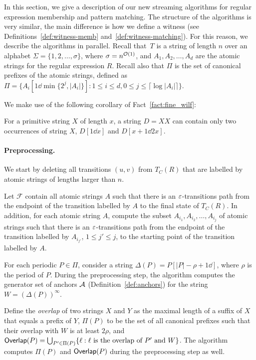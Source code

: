 In this section, we give a description of our new streaming algorithms for regular expression membership and pattern matching. The structure of the algorithms is very similar, the main difference is how we define a witness (see Definitions~\ref{def:witness-memb} and~\ref{def:witness-matching}). For this reason, we describe the algorithms in parallel. Recall that~$T$ is a string of length $n$ over an alphabet $\Sigma  = \{1, 2, \ldots, \sigma\}$, where $\sigma = n^{\mathcal{O}(1)}$, and $A_1, A_2, \ldots, A_d$ are the atomic strings for the regular expression $R$. Recall also that $\Pi$ is the set of canonical prefixes of the atomic strings, defined as $\Pi = \{A_i[1 \dd \min\{2^j, |A_i|\}] : 1\le  i \le d, 0 \le j \le \lceil \log |A_i|\rceil\}$. 

We make use of the following corollary of Fact~\ref{fact:fine_wilf}:

\begin{corollary}\label{cor:primitive}
For a primitive string $X$ of length $x$, a string $D = XX$ can contain only two occurrences of string $X$, $D[1\dd x]$ and $D[x+1\dd 2x]$.
\end{corollary}

\paragraph{Preprocessing.} 
We start by deleting all transitions $(u,v)$ from $T_C(R)$ that are labelled by atomic strings of lengths larger than $n$. 

Let $\mathcal{F}$ contain all atomic strings $A$ such that there is an $\varepsilon$-transitions path from the endpoint of the transition labelled by $A$ to the final state of $T_C(R)$. In addition, for each atomic string $A$, compute the subset $A_{i_1}, A_{i_2}, \ldots, A_{i_j}$ of atomic strings such that there is an $\varepsilon$-transitions path from the endpoint of the transition labelled by $A_{i_{j'}}$, $1 \le j' \le j$, to the starting point of the transition labelled by $A$.

For each periodic $P \in \Pi$, consider a string $\Delta(P) = P[|P|-\rho+1 \dd ]$, where $\rho$ is the period of $P$. During the preprocessing step, the algorithm computes the generator set of anchors $\mathcal{A}$ (Definition~\ref{def:anchors}) for the string~$W = (\Delta(P))^\infty$. 

Define the \emph{overlap} of two strings $X$ and $Y$ as the maximal length of a suffix of $X$ that equals a prefix of $Y$, $\Pi(P)$ to be the set of all canonical prefixes such that their overlap  with $W$ is at least $2 \rho$, and $\mathsf{Overlap}(P) = \bigcup_{P' \in  \Pi(P)} \{\ell: \ell \text{ is the overlap of } P' \text{ and }  W\}$. The algorithm computes $\Pi(P)$ and $\mathsf{Overlap}(P)$ during the preprocessing step as well. 

